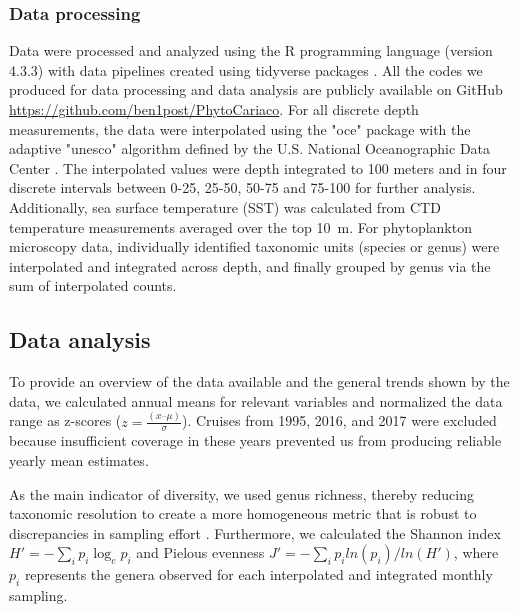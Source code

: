 \documentclass[draft]{agujournal2019}
\begin{document}
    \subsubsection{Data processing}
    Data were processed and analyzed using the R programming language (version 4.3.3) \cite{r_core_team_r_2024} with data pipelines created using tidyverse packages \cite{wickham_welcome_2019}. All the codes we produced for data processing and data analysis are publicly available on GitHub \url{https://github.com/ben1post/PhytoCariaco}.
    For all discrete depth measurements, the data were interpolated using the "oce" package \cite{kelley_oce_2023} with the adaptive "unesco" algorithm defined by the U.S. National Oceanographic Data Center \cite{johnson2006world}. The interpolated values were depth integrated to 100 meters and in four discrete intervals between 0-25, 25-50, 50-75 and 75-100 \meter for further analysis. Additionally, sea surface temperature (SST) was calculated from CTD temperature measurements averaged over the top \qty{10}{\meter}. For phytoplankton microscopy data, individually identified taxonomic units (species or genus) were interpolated and integrated across depth, and finally grouped by genus via the sum of interpolated counts.


\subsection{Data analysis}    
    To provide an overview of the data available  and the general trends shown by the data, we calculated annual means for relevant variables and normalized the data range as z-scores ($z = \frac{(x – \mu)}{\sigma}$). Cruises from 1995, 2016, and 2017 were excluded because insufficient coverage in these years prevented us from producing reliable yearly mean estimates. 
    
    As the main indicator of diversity, we used genus richness, thereby reducing taxonomic resolution to create a more homogeneous metric that is robust to discrepancies in sampling effort \cite{ptacnik_diversity_2008, de2020higher}. Furthermore, we calculated the Shannon index $H' = -\sum_i p_i \log_{e} p_i$ and Pielou\textquotesingle s evenness $J' = -\sum_i p_i ln( p_i )/ln(H')$, where $p_i$ represents the genera observed for each interpolated and integrated monthly sampling. 

      
\end{document}
